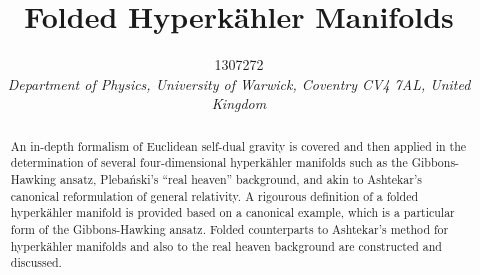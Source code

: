 \documentclass[a4paper,12pt, onecolumn, notitlepage]{article}
\theoremstyle{definition}
\theoremstyle{remark}
\newcommand{\HK}{hyperk\"ahler }
\begin{document}
\title{\textbf{\large{Folded Hyperk\"ahler Manifolds}}}
	
\author{\normalsize{1307272} \\
	\small\textit{
		Department of Physics, University of Warwick,
		Coventry CV4 7AL, United Kingdom}}
\date{}
\maketitle 
\vspace{-10mm}
\begin{abstract} 
\noindent
An in-depth formalism of Euclidean self-dual gravity is covered and then applied in the determination of several four-dimensional \HK manifolds such as the Gibbons-Hawking ansatz, Pleba\'nski's ``real heaven'' background, and akin to Ashtekar's canonical reformulation of general relativity.
A rigourous definition of a folded \HK manifold is provided based on a canonical example, which is a particular form of the Gibbons-Hawking ansatz. Folded counterparts to Ashtekar's method for \HK manifolds and also to the real heaven background are constructed and discussed.
\end{abstract}
\vspace{11mm}	
	
\end{document}
